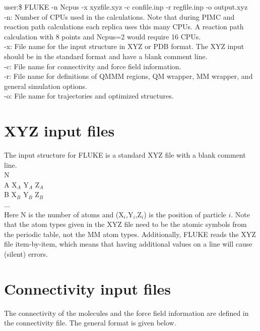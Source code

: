 \documentclass[12pt]{report}
\begin{document}
user:\$ FLUKE -n Ncpus -x xyzfile.xyz -c confile.inp
 -r regfile.inp -o output.xyz \\

-n: Number of CPUs used in the calculations. Note that during PIMC and
reaction path calculations each replica uses this many CPUs. A reaction
path calculation with 8 points and Ncpus=2 would require 16 CPUs. \\

-x: File name for the input structure in XYZ or PDB format. The XYZ input
should be in the standard format and have a blank comment line. \\

-c: File name for connectivity and force field information. \\

-r: File name for definitions of QMMM regions, QM wrapper, MM wrapper,
and general simulation options. \\

-o: File name for trajectories and optimized structures. \\

\section{XYZ input files}

The input structure for FLUKE is a standard XYZ file with a blank comment
line. \\

N \\

A  X$_A$  Y$_A$  Z$_A$ \\
B  X$_B$  Y$_B$  Z$_B$ \\
... \\

Here N is the number of atoms and (X$_i$,Y$_i$,Z$_i$) is the position of
particle $i$. Note that the atom types given in the XYZ file need to be the
atomic symbols from the periodic table, not the MM atom types. Additionally,
FLUKE reads the XYZ file item-by-item, which means that having additional
values on a line will cause (silent) errors.

\section{Connectivity input files}

The connectivity of the molecules and the force field information are defined
in the connectivity file. The general format is given below. \\
\end{document}
